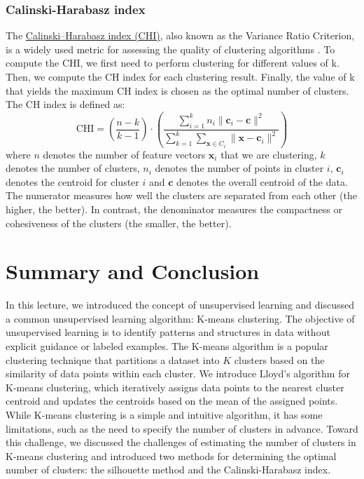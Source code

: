 \documentclass{article}[11pt]
\begin{document}
\subsubsection*{Calinski-Harabasz index}
The \href{https://en.wikipedia.org/wiki/Calinski%E2%80%93Harabasz_index}{Calinski–Harabasz index (CHI)}, also known as the Variance Ratio Criterion, 
is a widely used metric for assessing the quality of clustering algorithms \citep{Caliski01011974}. To compute the CHI, we first need to perform clustering for different values of k. 
Then, we compute the CH index for each clustering result. Finally, the value of k that yields the maximum CH index is chosen as the optimal number of clusters. The CH index is defined as:
\begin{equation}
\text{CHI} = \left(\frac{n-k}{k-1}\right)\cdot\left(\frac{\sum_{i=1}^{k}n_{i}\lVert{\mathbf{c}_{i}-\mathbf{c}}\rVert^{2}}{\sum_{k=1}^{k}\sum_{\mathbf{x}\in{C_{i}}}\lVert{\mathbf{x}-\mathbf{c}_{i}}\rVert^{2}}\right)
\end{equation}
where $n$ denotes the number of feature vectors $\mathbf{x}_{i}$ that we are clustering, $k$ denotes the number of clusters, $n_{i}$ denotes the number of points in cluster $i$, $\mathbf{c}_{i}$ denotes the centroid for cluster $i$ and $\mathbf{c}$ denotes the overall centroid of the data. 
The numerator measures how well the clusters are separated from each other (the higher, the better). In contrast, the denominator measures the compactness or cohesiveness of the clusters (the smaller, the better).


\section{Summary and Conclusion}
In this lecture, we introduced the concept of unsupervised learning and discussed a common unsupervised learning algorithm: K-means clustering.
The objective of unsupervised learning is to identify patterns and structures in data without explicit guidance or labeled examples.
The K-means algorithm is a popular clustering technique that partitions a dataset into $K$ clusters based on the similarity of data points within each cluster.
We introduce Lloyd's algorithm for K-means clustering, which iteratively assigns data points to the nearest cluster centroid and updates the centroids based on the mean of the assigned points.
While K-means clustering is a simple and intuitive algorithm, it has some limitations, such as the need to specify the number of clusters in advance.
Toward this challenge, we discussed the challenges of estimating the number of clusters in K-means clustering and introduced two methods for determining the optimal number of clusters: 
the silhouette method and the Calinski-Harabasz index.




\end{document}
